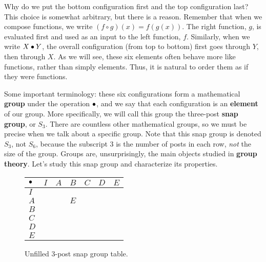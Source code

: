 \documentclass[../gatm.tex]{subfiles}
\begin{document}
Why do we put the bottom configuration first and the top configuration last? This choice is somewhat arbitrary, but there is a reason. Remember that when we compose functions, we write $(f \circ g)(x)=f(g(x))$. The right function, $g$, is evaluated first and used as an input to the left function, $f$. Similarly, when we write $X\bullet Y$, the overall configuration (from top to bottom) first goes through $Y$, then through $X$. As we will see, these six elements often behave more like functions, rather than simply elements. Thus, it is natural to order them as if they were functions.

Some important terminology: these six configurations form a mathematical \textbf{group} under the operation $\bullet$, and we say that each configuration is an \textbf{element} of our group.
More specifically, we will call this group the three-post \textbf{snap group}, or $S_3$. There are countless other mathematical groups, so we must be precise when we talk about a specific group. Note that this snap group is denoted $S_3$, not $S_6$, because the subscript $3$ is the number of posts in each row, \textit{not} the size of the group.
Groups are, unsurprisingly, the main objects studied in \textbf{group theory}.
Let's study this snap group and characterize its properties.


\begin{figure}
	\begin{center}
		\begin{tabular}{C|C|C|C|C|C|C|}
			$\bullet$ & $I$ & $A$ & $B$ & $C$ & $D$ & $E$ \\ \hline
			$I$     &     &     &     &     &     &     \\ \hline
			$A$     &     &     & $E$ &     &     &     \\ \hline
			$B$     &     &     &     &     &     &     \\ \hline
			$C$     &     &     &     &     &     &     \\ \hline
			$D$     &     &     &     &     &     &     \\ \hline
			$E$     &     &     &     &     &     &     \\ \hline
		\end{tabular}
	\end{center}
	\caption{Unfilled $3$-post snap group table.}
	\label{fig:sbstable_CHANG}
\end{figure}
\end{document}
